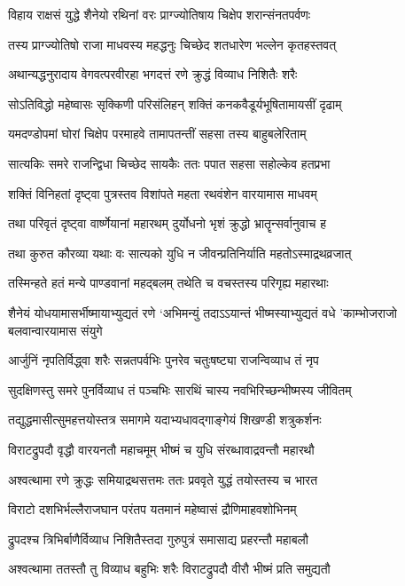 \twolineshloka
{विहाय राक्षसं युद्धे शैनेयो रथिनां वरः}
{प्राग्ज्योतिषाय चिक्षेप शरान्संनतपर्वणः}


\twolineshloka
{तस्य प्राग्ज्योतिषो राजा माधवस्य महद्धनुः}
{चिच्छेद शतधारेण भल्लेन कृतहस्तवत्}


\twolineshloka
{अथान्यद्धनुरादाय वेगवत्परवीरहा}
{भगदत्तं रणे क्रुद्धं विव्याध निशितैः शरैः}


\twolineshloka
{सोऽतिविद्धो महेष्वासः सृक्किणी परिसंलिहन्}
{शक्तिं कनकवैडूर्यभूषितामायसीं दृढाम्}


\twolineshloka
{यमदण्डोपमां घोरां चिक्षेप परमाहवे}
{तामापतन्तीं सहसा तस्य बाहुबलेरिताम्}


\twolineshloka
{सात्यकिः समरे राजन्द्विधा चिच्छेद सायकैः}
{ततः पपात सहसा सहोल्केव हतप्रभा}


\twolineshloka
{शक्तिं विनिहतां दृष्ट्वा पुत्रस्तव विशांपते}
{महता रथवंशेन वारयामास माधवम्}


\twolineshloka
{तथा परिवृतं दृष्ट्वा वार्ष्णेयानां महारथम्}
{दुर्योधनो भृशं क्रुद्धो भ्रातॄन्सर्वानुवाच ह}


\twolineshloka
{तथा कुरुत कौरव्या यथाः वः सात्यको युधि}
{न जीवन्प्रतिनिर्याति महतोऽस्माद्रथव्रजात्}


\twolineshloka
{तस्मिन्हते हतं मन्ये पाण्डवानां महद्बलम्}
{तथेति च वचस्तस्य परिगृह्य महारथाः}


\threelineshloka
{शैनेयं योधयामासर्भीष्मायाभ्युद्यतं रणे}
{`अभिमन्युं तदाऽऽयान्तं भीष्मस्याभ्युद्यतं वधे}
{'काम्भोजराजो बलवान्वारयामास संयुगे}


\twolineshloka
{आर्जुनिं नृपतिर्विद्ध्वा शरैः सन्नतपर्वभिः}
{पुनरेव चतुःषष्ट्या राजन्विव्याध तं नृप}


\twolineshloka
{सुदक्षिणस्तु समरे पुनर्विव्याध तं पञ्चभिः}
{सारथिं चास्य नवभिरिच्छन्भीष्मस्य जीवितम्}


\twolineshloka
{तद्युद्धमासीत्सुमहत्तयोस्तत्र समागमे}
{यदाभ्यधावद्गाङ्गेयं शिखण्डी शत्रुकर्शनः}


\twolineshloka
{विराटद्रुपदौ वृद्धौ वारयनतौ महाचमूम्}
{भीष्मं च युधि संरब्धावाद्रवन्तौ महारथौ}


\twolineshloka
{अश्वत्थामा रणे क्रुद्धः समियाद्रथसत्तमः}
{ततः प्रववृते युद्धं तयोस्तस्य च भारत}


\twolineshloka
{विराटो दशभिर्भल्लैराजघान परंतप}
{यतमानं महेष्वासं द्रौणिमाहवशोभिनम्}


\twolineshloka
{द्रुपदश्च त्रिभिर्बाणैर्विव्याध निशितैस्तदा}
{गुरुपुत्रं समासाद्य प्रहरन्तौ महाबलौ}


\twolineshloka
{अश्वत्थामा ततस्तौ तु विव्याध बहुभिः शरैः}
{विराटद्रुपदौ वीरौ भीष्मं प्रति समुद्यतौ}


